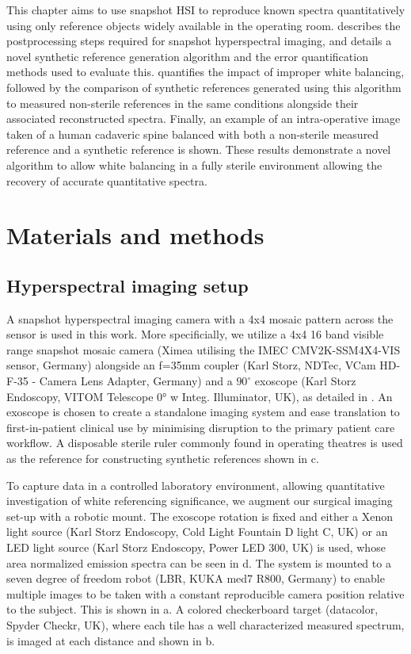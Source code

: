 This chapter aims to use snapshot HSI to reproduce known spectra quantitatively using only reference objects widely available in the operating room.
 describes the postprocessing steps required for snapshot hyperspectral imaging, and details a novel synthetic reference generation algorithm and the error quantification methods used to evaluate this.  quantifies the impact of improper white balancing, followed by the comparison of synthetic references generated using this algorithm to measured non-sterile references in the same conditions alongside their associated reconstructed spectra. Finally, an example of an intra-operative image taken of a human cadaveric spine balanced with both a non-sterile measured reference and a synthetic reference is shown. These results demonstrate a novel algorithm to allow white balancing in a fully sterile environment allowing the recovery of accurate quantitative spectra. 
% 

\section{Materials and methods}
\label{method}

%
\subsection{Hyperspectral imaging setup}
\label{materials}
A snapshot hyperspectral imaging camera with a 4x4 mosaic pattern across the sensor is used in this work.
%
More specificially, we utilize a
4x4 16 band visible range snapshot mosaic camera (Ximea utilising the IMEC CMV2K-SSM4X4-VIS sensor, Germany) alongside an f=35mm coupler (Karl Storz, NDTec, VCam HD-F-35 - Camera Lens Adapter, Germany) and a $90^\circ$ exoscope (Karl Storz Endoscopy, VITOM Telescope 0° w Integ. Illuminator, UK), as detailed in \citet{Ebner2021}. An exoscope is chosen to create a standalone imaging system and ease translation to first-in-patient clinical use by minimising disruption to the primary patient care workflow. A disposable sterile ruler commonly found in operating theatres is used as the reference for constructing synthetic references shown in c.

To capture data in a controlled laboratory environment, allowing quantitative investigation of white referencing significance, we augment our surgical imaging set-up with a robotic mount. The exoscope rotation is fixed and either a Xenon light source (Karl Storz Endoscopy, Cold Light Fountain D light C, UK) or an LED light source (Karl Storz Endoscopy, Power LED 300, UK) is used, whose area normalized emission spectra can be seen in d. The system is mounted to a seven degree of freedom robot (LBR, KUKA med7 R800, Germany) to enable multiple images to be taken with a constant reproducible camera position relative to the subject.
This is shown in a. A colored checkerboard target (datacolor, Spyder Checkr, UK), where each tile has a well characterized measured spectrum, is imaged at each distance and shown in b. 

